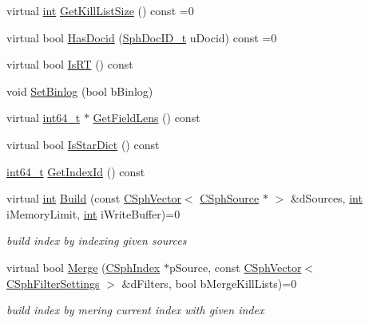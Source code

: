 \begin{DoxyCompactItemize}
\item 
virtual \hyperlink{sphinxexpr_8cpp_a4a26e8f9cb8b736e0c4cbf4d16de985e}{int} \hyperlink{classCSphIndex_afc96ce6459f93e6a214a0433691bd6da}{Get\-Kill\-List\-Size} () const =0
\item 
virtual bool \hyperlink{classCSphIndex_adb5aa35c6a81bb37cb9895a3938edb6e}{Has\-Docid} (\hyperlink{sphinx_8h_a3176771631c12a9e4897272003e6b447}{Sph\-Doc\-I\-D\-\_\-t} u\-Docid) const =0
\item 
virtual bool \hyperlink{classCSphIndex_a3faa5505679dc073b2669e4f241e3dda}{Is\-R\-T} () const 
\item 
void \hyperlink{classCSphIndex_adb34aa6b4a8a4ad70cc5604a19d9b991}{Set\-Binlog} (bool b\-Binlog)
\item 
virtual \hyperlink{sphinxstd_8h_a996e72f71b11a5bb8b3b7b6936b1516d}{int64\-\_\-t} $\ast$ \hyperlink{classCSphIndex_ab9b5c8ae5b87827dab4961f458c41fba}{Get\-Field\-Lens} () const 
\item 
virtual bool \hyperlink{classCSphIndex_aaa446cd3c180b24ba5b4a9a5654ac8fe}{Is\-Star\-Dict} () const 
\item 
\hyperlink{sphinxstd_8h_a996e72f71b11a5bb8b3b7b6936b1516d}{int64\-\_\-t} \hyperlink{classCSphIndex_ab272ed626c7a597ee8e5950220b2a32e}{Get\-Index\-Id} () const 
\item 
virtual \hyperlink{sphinxexpr_8cpp_a4a26e8f9cb8b736e0c4cbf4d16de985e}{int} \hyperlink{classCSphIndex_a511623b7f266c3bdded675613aba2939}{Build} (const \hyperlink{classCSphVector}{C\-Sph\-Vector}$<$ \hyperlink{classCSphSource}{C\-Sph\-Source} $\ast$ $>$ \&d\-Sources, \hyperlink{sphinxexpr_8cpp_a4a26e8f9cb8b736e0c4cbf4d16de985e}{int} i\-Memory\-Limit, \hyperlink{sphinxexpr_8cpp_a4a26e8f9cb8b736e0c4cbf4d16de985e}{int} i\-Write\-Buffer)=0
\begin{DoxyCompactList}\small\item\em build index by indexing given sources \end{DoxyCompactList}\item 
virtual bool \hyperlink{classCSphIndex_ab27064d2a9275e8683fccaa9472894d5}{Merge} (\hyperlink{classCSphIndex}{C\-Sph\-Index} $\ast$p\-Source, const \hyperlink{classCSphVector}{C\-Sph\-Vector}$<$ \hyperlink{classCSphFilterSettings}{C\-Sph\-Filter\-Settings} $>$ \&d\-Filters, bool b\-Merge\-Kill\-Lists)=0
\begin{DoxyCompactList}\small\item\em build index by mering current index with given index \end{DoxyCompactList}\item 

\end{DoxyCompactItemize}
